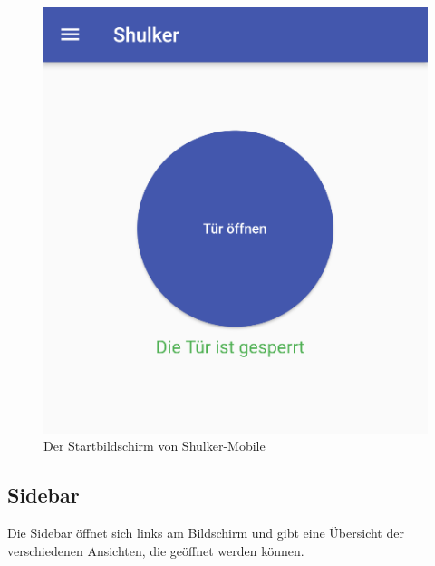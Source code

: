 \begin{figure}[H]
    \begin{center}
        \includegraphics[width=.6\textwidth]{images/mobile/Homescreen.png}
        \caption{Der Startbildschirm von Shulker-Mobile}
    \end{center}
\end{figure}

\subsection{Sidebar}
Die Sidebar öffnet sich links am Bildschirm und gibt eine Übersicht der verschiedenen Ansichten,
die geöffnet werden können.

